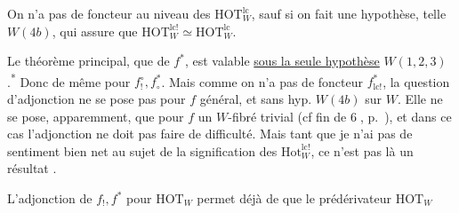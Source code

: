 

On n'a pas de foncteur  au niveau des $\mathrm{HOT}^{\mathrm{lc}}_W$, sauf si on fait une hypothèse, telle \uline{$W(4b)$}, qui assure que $\mathrm{HOT}^{\mathrm{lc}!}_W\simeq\mathrm{HOT}^{\mathrm{lc}}_W$.

Le théorème principal, que     de $f^*$, est valable \uline{sous la seule hypothèse} $W(1,2,3)$.\textsuperscript{*}
Donc de même pour $f_!^\circ,f_\circ^*$. Mais comme on n'a pas de foncteur  $f^*_{\mathrm{lc}!}$, la question d'adjonction ne se pose pas pour $f$ général, et sans hyp. $W(4b)$ sur $W$. Elle ne se pose, apparemment, que pour $f$ un $W$-fibré trivial (cf fin de \textcircled{6}, p.~), et dans ce cas l'adjonction ne doit pas faire de difficulté. Mais tant que je n'ai pas de sentiment bien net au sujet de la signification des $\mathrm{Hot}^{\mathrm{lc}!}_W$, ce n'est pas là un résultat  .

L'adjonction de $f_!,f^*$ pour $\mathrm{HOT}_W$ permet déjà de  que le prédérivateur $\mathrm{HOT}_W$
